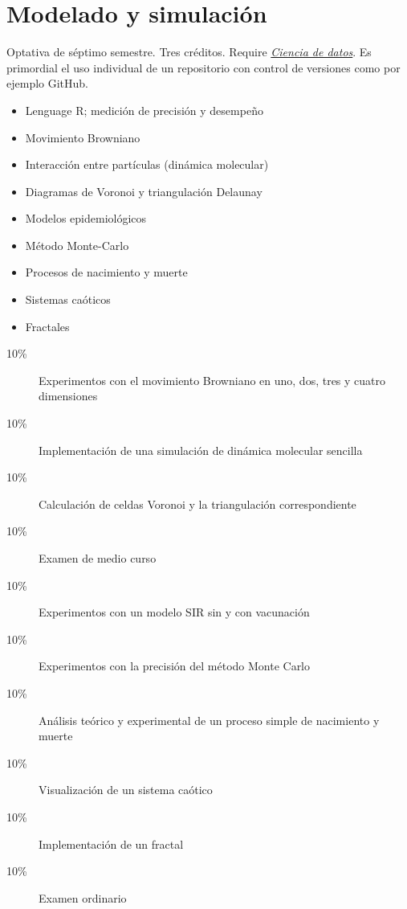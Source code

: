 \documentclass{article}
\begin{document}
\begin{multicols}{4}
\hypertarget{mys}{\section*{Modelado y simulaci\'{o}n}}

Optativa de s\'{e}ptimo semestre. Tres cr\'{e}ditos. Require
\hyperlink{cdd}{\em Ciencia de datos}. Es primordial el uso individual
de un repositorio con control de versiones como por ejemplo GitHub.

\begin{itemize}
\item{Lenguage R; medici\'{o}n de precisi\'{o}n y desempe\~{n}o}
\item{Movimiento Browniano}
\item{Interacci\'{o}n entre part\'{i}culas (din\'{a}mica molecular)}  
\item{Diagramas de Voronoi y triangulaci\'{o}n Delaunay}  
\item{Modelos epidemiol\'{o}gicos}
\item{M\'{e}todo Monte-Carlo}
\item{Procesos de nacimiento y muerte}
\item{Sistemas ca\'{o}ticos}
\item{Fractales}
\end{itemize}

\begin{description}
\item[10\%]{Experimentos con el movimiento Browniano en uno, dos, tres
  y cuatro dimensiones}
\item[10\%]{Implementaci\'{o}n de una simulaci\'{o}n de din\'{a}mica molecular
  sencilla}
\item[10\%]{Calculaci\'{o}n de celdas Voronoi y la triangulaci\'{o}n correspondiente}
\item[10\%]{Examen de medio curso}
\item[10\%]{Experimentos con un modelo SIR sin y con vacunaci\'{o}n}
\item[10\%]{Experimentos con la precisi\'{o}n del m\'{e}todo Monte Carlo}
\item[10\%]{An\'{a}lisis te\'{o}rico y experimental de un proceso simple de nacimiento y muerte}
\item[10\%]{Visualizaci\'{o}n de un sistema ca\'{o}tico}
\item[10\%]{Implementaci\'{o}n de un fractal}  
\item[10\%]{Examen ordinario}
\end{description}  


\end{multicols}
\end{document}
